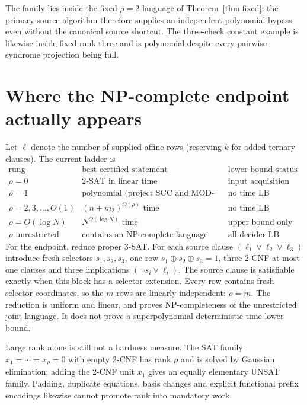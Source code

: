 \documentclass[11pt]{article}
\begin{document}
The family lies inside the fixed-$\rho=2$ language of
Theorem~\ref{thm:fixed}; the primary-source algorithm therefore supplies an
independent polynomial bypass even without the canonical source shortcut.
The three-check constant example is likewise inside fixed rank three and is
polynomial despite every pairwise syndrome projection being full.

\section{Where the NP-complete endpoint actually appears}
Let \(\ell\) denote the number of supplied affine rows (reserving $k$ for
added ternary clauses).  The current ladder is
\[
\begin{array}{c|c|c}
\text{rung}&\text{best certified statement}&\text{lower-bound status}\\\hline
\rho=0&\text{2-SAT in linear time}&\text{input acquisition only}\\
\rho=1&\text{polynomial (project SCC and MOD-CSP)}&\text{no time LB}\\
\rho=2,3,\ldots,O(1)&(n+m_2)^{O(\rho)}\text{ time}&\text{no time LB}\\
\rho=O(\log N)&N^{O(\log N)}\text{ time}&\text{upper bound only}\\
\rho\text{ unrestricted}&\text{contains an NP-complete language}&\text{all-decider LB OPEN}
\end{array}                                             \tag{5}
\]
For the endpoint, reduce proper 3-SAT.  For each source clause
$(\ell_1\vee\ell_2\vee\ell_3)$ introduce fresh selectors
$s_1,s_2,s_3$, one row $s_1\oplus s_2\oplus s_3=1$, three 2-CNF
at-most-one clauses and three implications $(\neg s_i\vee\ell_i)$.
The source clause is satisfiable exactly when this block has a selector
extension.  Every row contains fresh selector coordinates, so the $m$ rows
are linearly independent: $\rho=m$.  The reduction is uniform and linear,
and proves NP-completeness of the unrestricted joint language.  It does not
prove a superpolynomial deterministic time lower bound.

Large rank alone is still not a hardness measure.  The SAT family
$x_1=\cdots=x_\rho=0$ with empty 2-CNF has rank $\rho$ and is solved by
Gaussian elimination; adding the 2-CNF unit $x_1$ gives an equally elementary
UNSAT family.  Padding, duplicate equations, basis changes and explicit
functional prefix encodings likewise cannot promote rank into mandatory
work.
\end{document}
